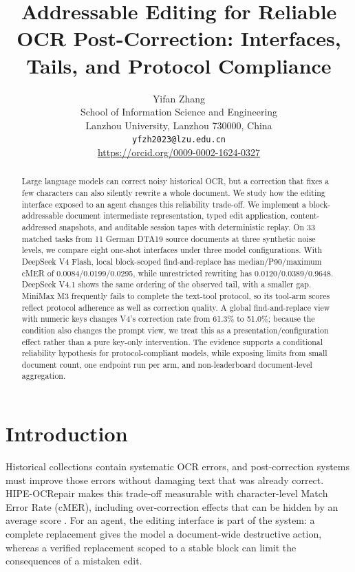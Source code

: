 \documentclass{article}
\title{Addressable Editing for Reliable OCR Post-Correction: Interfaces, Tails, and Protocol Compliance}
\author{Yifan Zhang\\
School of Information Science and Engineering\\
Lanzhou University, Lanzhou 730000, China\\
\texttt{yfzh2023@lzu.edu.cn}\\
\url{https://orcid.org/0009-0002-1624-0327}}
\date{}
\begin{document}
\maketitle

\begin{abstract}
Large language models can correct noisy historical OCR, but a correction that fixes a few characters can also silently rewrite a whole document. We study how the editing interface exposed to an agent changes this reliability trade-off. We implement a block-addressable document intermediate representation, typed edit application, content-addressed snapshots, and auditable session tapes with deterministic replay. On 33 matched tasks from 11 German DTA19 source documents at three synthetic noise levels, we compare eight one-shot interfaces under three model configurations. With DeepSeek V4 Flash, local block-scoped find-and-replace has median/P90/maximum cMER of 0.0084/0.0199/0.0295, while unrestricted rewriting has 0.0120/0.0389/0.9648. DeepSeek V4.1 shows the same ordering of the observed tail, with a smaller gap. MiniMax M3 frequently fails to complete the text-tool protocol, so its tool-arm scores reflect protocol adherence as well as correction quality. A global find-and-replace view with numeric keys changes V4's correction rate from 61.3\% to 51.0\%; because the condition also changes the prompt view, we treat this as a presentation/configuration effect rather than a pure key-only intervention. The evidence supports a conditional reliability hypothesis for protocol-compliant models, while exposing limits from small document count, one endpoint run per arm, and non-leaderboard document-level aggregation.
\end{abstract}

\section{Introduction}
Historical collections contain systematic OCR errors, and post-correction systems must improve those errors without damaging text that was already correct. HIPE-OCRepair makes this trade-off measurable with character-level Match Error Rate (cMER), including over-correction effects that can be hidden by an average score \citep{ehrmann2026hipe}. For an agent, the editing interface is part of the system: a complete replacement gives the model a document-wide destructive action, whereas a verified replacement scoped to a stable block can limit the consequences of a mistaken edit.
\end{document}
